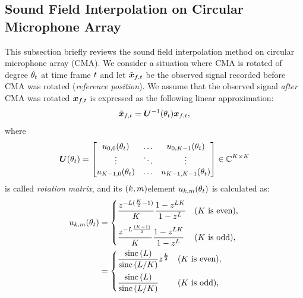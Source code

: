 \documentclass[sip,biber]{now-journal}
\begin{document}
\subsection{Sound Field Interpolation on Circular Microphone Array}
This subsection briefly reviews the sound field interpolation method on circular microphone array (CMA).
We consider a situation where CMA is rotated of degree $\theta _{t}$ at time frame $t$ and let $\refpos{\Obs} _{\ft}$ be the observed signal recorded before CMA was rotated (\emph{reference position}).
We assume that the observed signal \emph{after} CMA was rotated $\Obs _{\ft}$ is expressed as the following linear approximation:
\begin{equation}
  \refpos{\Obs} _{\ft} = \rotMat ^{-1} (\rotSpat _{\tframe}) \Obs _{\ft},
\end{equation}
where
\begin{equation}
  \bm{U} (\theta _{t}) =
  \begin{bmatrix}
    u _{0, 0}(\theta _{t}) & \dots & u _{0, K - 1}(\theta _{t}) \\
    \vdots & \ddots & \vdots \\
    u _{K - 1, 0}(\theta _{t}) & \dots & u _{K - 1, K - 1}(\theta _{t})
  \end{bmatrix}
  \in \mathbb{C} ^{K\times K}
\end{equation}
is called \emph{rotation matrix}, and its $(k,m)$element $u _{k,m} (\theta _{t})$ is calculated as:
\begin{align}
  u _{k,m}(\theta _{t})
  &=
    \begin{cases}
      \displaystyle\frac{z ^{- L (\frac{K}{2} - 1) }}{K} \frac{1 - z ^{L K}}{1 - z ^{L}} & (\text{$K$ is even}),\\[1em]
      \displaystyle\frac{z ^{- L \frac{(K - 1)}{2}}}{K} \frac{1 - z ^{L K}}{1 - z ^{L}} & (\text{$K$ is odd}),
    \end{cases}\label{eq:rot:twid} \\
  &=
    \begin{cases}
      \displaystyle \frac{\operatorname{sinc}{(L)}}{\operatorname{sinc}{\left(L / K\right)}} z ^{\frac{L}{2}} & (\text{$K$ is even}),\\[1em]
      \displaystyle \frac{\operatorname{sinc}{(L)}}{\operatorname{sinc}{\left(L / K\right)}} & (\text{$K$ is odd}),
    \end{cases}\label{eq:rot:sinc}
\end{align}
\end{document}
